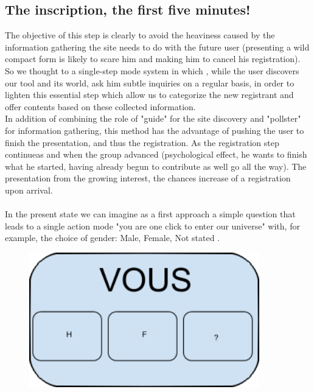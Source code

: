 \documentclass {life-en}
\begin{document}
\subsection{The inscription, the first five minutes!}

The objective of this step is clearly to avoid the heaviness caused by the information gathering the site needs to do with the future user (presenting a wild compact form is likely to scare him and making him to cancel his registration).\\

So we thought to a single-step mode system in which , while the user discovers our tool and its world, ask him subtle inquiries on a regular basis, in order to lighten this essential step which allow us to categorize the new registrant and offer contents based on these collected information.\\

In addition of combining the role of "guide" for the site discovery and "pollster" for information gathering, this method has the advantage of pushing the user to finish the presentation, and thus the registration. As the registration step continueas and when the group advanced (psychological effect, he wants to finish what he started, having already begun to contribute as well go all the way). The presentation from the growing interest, the chances increase of a registration upon arrival.\\
\\

In the present state we can imagine as a first approach a simple question that leads to a single action mode "you are one click to enter our universe" with, for example, the choice of gender: Male, Female, Not stated .

\begin{figure} [H]
  \begin{center}
    \includegraphics [width = 10cm]{img/vous.png}
  \end{center}
\end{figure}
\end{document}
